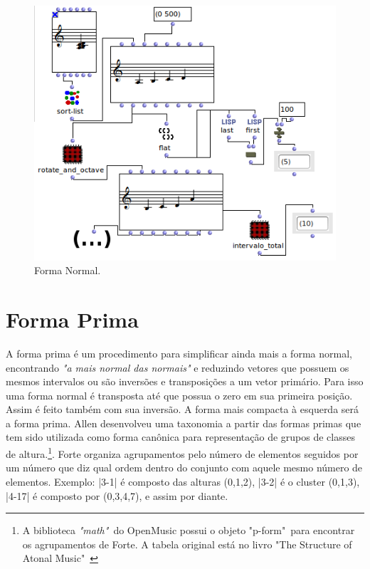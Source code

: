 \documentclass[
	12pt,				%
	openright,			%
	twoside,			%
	a4paper,			%
	english,			%
	french,				%
	spanish,			%
	brazil				%
	]{abntex2}
\begin{document}
\begin{apendicesenv}
\begin{figure}[h]
	\caption{\label{fig_grafico}Forma Normal. }
	\begin{center}
	    \includegraphics[scale=0.7]{OM_settheory/forma_normal.png}
	\end{center}
\end{figure}


\section{Forma Prima} 

A forma prima é um procedimento para simplificar ainda mais a forma normal, encontrando \textit{"a mais normal das normais"}\cite[p. 47]{straus2004} e reduzindo vetores que possuem os mesmos intervalos ou são inversões e transposições a um vetor primário. Para isso uma forma normal é transposta até que possua o zero em sua primeira posição. Assim é feito também com sua inversão. A forma mais compacta à esquerda será a forma prima. Allen  desenvolveu uma taxonomia a partir das formas primas que tem sido utilizada como forma canônica para representação de grupos de classes de altura.\footnote{A biblioteca \textit{"math"}\ do OpenMusic possui o objeto "p-form"\ para encontrar os agrupamentos de Forte. A tabela original está no livro "The Structure of Atonal Music"\ \cite[p.179-181]{forte1973structure}}. Forte organiza agrupamentos pelo número de elementos seguidos por um número que diz qual ordem dentro do conjunto com aquele mesmo número de elementos. Exemplo: |3-1| é composto das alturas (0,1,2), |3-2|  é o cluster (0,1,3), |4-17|  é composto por (0,3,4,7), e assim por diante.


\end{apendicesenv}
\end{document}
